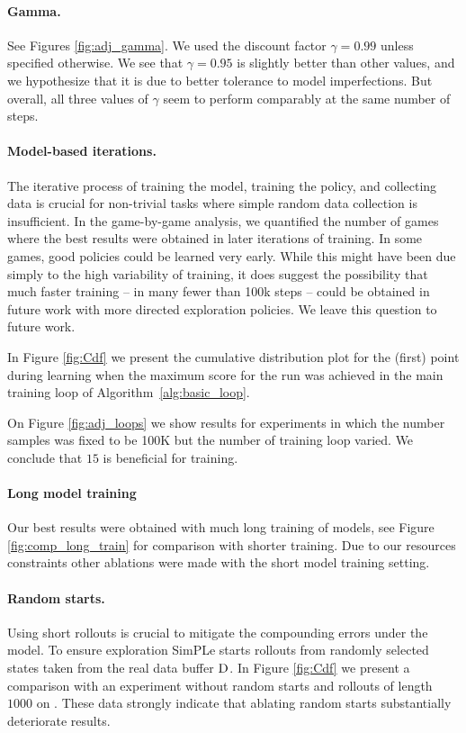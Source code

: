 \paragraph{Gamma.} See Figures \ref{fig:adj_gamma}. We used the discount factor $\gamma=0.99$ unless specified otherwise.  We see that $\gamma=0.95$ is slightly better than other values, and we hypothesize that it is due to better tolerance to model imperfections. But overall, all three values of $\gamma$ seem to perform comparably at the same number of steps.


\paragraph{Model-based iterations.}
The iterative process of training the model, training the policy, and collecting data is crucial for non-trivial tasks where simple random data collection is insufficient. In the game-by-game analysis, we quantified the number of games where the best results were obtained in later iterations of training. In some games, good policies could be learned very early. While this might have been due simply to the high variability of training, it does suggest the possibility that much faster training -- in many fewer than 100k steps -- could be obtained in future work with more directed exploration policies. We leave this question to future work.

In Figure \ref{fig:Cdf} we present the cumulative distribution plot for the (first) point during learning when the maximum score for the run was achieved in the main training loop of Algorithm~\ref{alg:basic_loop}.

On Figure \ref{fig:adj_loops} we show results for experiments in which the number samples was fixed to be 100K but the number of training loop varied. We conclude that $15$ is beneficial for training.

\paragraph{Long model training} Our best results were obtained with much long training of models, see Figure \ref{fig:comp_long_train} for comparison with shorter training. Due to our resources constraints other ablations were made with the short model training setting.


\paragraph{Random starts.} Using short rollouts is crucial to mitigate the compounding errors under the model. To ensure exploration SimPLe starts rollouts from randomly selected states taken from the real data buffer $\textsc{D}$. In Figure \ref{fig:Cdf} we present a comparison with an experiment without random starts and rollouts of length $1000$ on \seaquest. These data strongly indicate that ablating random starts substantially deteriorate results.  


